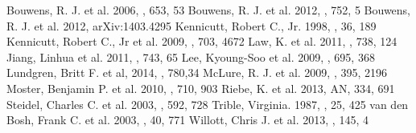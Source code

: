 \begin{thebibliography}{}
 Bouwens, R. J. et al. 2006, \apj, 653, 53	
 Bouwens, R. J. et al. 2012, \apj, 752, 5 	
 Bouwens, R. J. et al. 2012, arXiv:1403.4295
 Kennicutt, Robert C., Jr. 1998, \araa, 
36, 189		%
 Kennicutt, Robert C., Jr et al. 2009, \apj, 
703, 4672	%
 Law, K. et al. 2011, \apj, 738, 124
 Jiang, Linhua et al. 2011, \apj, 743, 65
 Lee, Kyoung-Soo et al. 2009, \apj, 695, 368
 Lundgren, Britt F. et al, 2014, \apj, 780,34
 McLure, R. J. et al. 2009, \mnras, 395, 2196	
 Moster, Benjamin P. et al. 2010, \apj, 710, 
903 
 Riebe, K. et al. 2013, AN, 334, 691 		
 Steidel, Charles C. et al. 2003, \apj, 592, 
728 		%
 Trible, Virginia. 1987, \araa, 25, 425
 van den Bosh, Frank C. et al. 2003, \mnras,
40, 771		%
 Willott, Chris J. et al. 2013, \aj, 145, 4	
\end{thebibliography}
